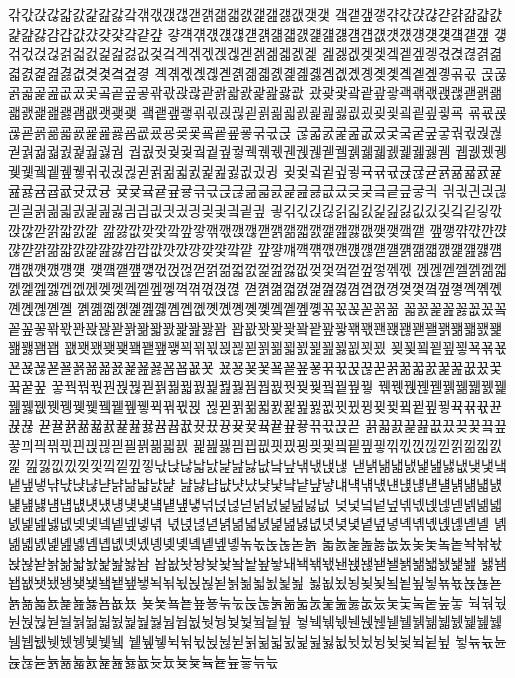 갂갃갅갆갋갌갍갎갏갘갞갟갡갢갣갥갦갧갨갩갪갫갮갲갳
갴갵갶갷갺갻갽갾갿걁걂걃걄걅걆걇걈걉걊걌걎걏걐걑걒
걓걕걖걗걙걚걛걝걞걟걠걡걢걣걤걥걦걧걨걩걪걫걬걭걮
걯걲걳걵걶걹걻걼걽걾걿겂겇겈겍겎겏겑겒겓겕겖겗겘겙
겚겛겞겢겣겤겥겦겧겫겭겮겱겲겳겴겵겶겷겺겾겿곀곂곃
곅곆곇곉곊곋곍곎곏곐곑곒곓곔곖곘곙곚곛곜곝곞곟곢곣
곥곦곩곫곭곮곲곴곷곸곹곺곻곾곿괁괂괃괅괇괈괉괊괋괎
괐괒괓괔괕괖괗괙괚괛괝괞괟괡괢괣괤괥괦괧괨괪괫괮괯
괰괱괲괳괶괷괹괺괻괽괾괿굀굁굂굃굆굈굊굋굌굍굎굏굑
굒굓굕굖굗굙굚굛굜굝굞굟굠굢굤굥굦굧굨굩굪굫굮굯굱
굲굷굸굹굺굾궀궃궄궅궆궇궊궋궍궎궏궑궒궓궔궕궖궗궘
궙궚궛궞궟궠궡궢궣궥궦궧궨궩궪궫궬궭궮궯궰궱궲궳궴
궵궶궸궹궺궻궼궽궾궿귂귃귅귆귇귉귊귋귌귍귎귏귒귔귕
귖귗귘귙귚귛귝귞귟귡귢귣귥귦귧귨귩귪귫귬귭귮귯귰귱
귲귳귴귵귶귷귺귻귽귾긂긃긄긅긆긇긊긌긎긏긐긑긒긓긕
긖긗긘긙긚긛긜긝긞긟긠긡긢긣긤긥긦긧긨긩긪긫긬긭긮
긯긲긳긵긶긹긻긼긽긾긿깂깄깇깈깉깋깏깑깒깓깕깗깘깙
깚깛깞깢깣깤깦깧깪깫깭깮깯깱깲깳깴깵깶깷깺깾깿꺀꺁
꺂꺃꺆꺇꺈꺉꺊꺋꺍꺎꺏꺐꺑꺒꺓꺔꺕꺖꺗꺘꺙꺚꺛꺜꺝
꺞꺟꺠꺡꺢꺣꺤꺥꺦꺧꺨꺩꺪꺫꺬꺭꺮꺯꺰꺱꺲꺳꺴꺵꺶
꺷꺸꺹꺺꺻꺿껁껂껃껅껆껇껈껉껊껋껎껒껓껔껕껖껗껚껛
껝껞껟껠껡껢껣껤껥껦껧껩껪껬껮껯껰껱껲껳껵껶껷껹껺
껻껽껾껿꼀꼁꼂꼃꼄꼅꼆꼉꼊꼋꼌꼎꼏꼑꼒꼓꼔꼕꼖꼗꼘
꼙꼚꼛꼜꼝꼞꼟꼠꼡꼢꼣꼤꼥꼦꼧꼨꼩꼪꼫꼮꼯꼱꼳꼵꼶
꼷꼸꼹꼺꼻꼾꽀꽄꽅꽆꽇꽊꽋꽌꽍꽎꽏꽑꽒꽓꽔꽕꽖꽗꽘
꽙꽚꽛꽞꽟꽠꽡꽢꽣꽦꽧꽨꽩꽪꽫꽬꽭꽮꽯꽰꽱꽲꽳꽴꽵
꽶꽷꽸꽺꽻꽼꽽꽾꽿꾁꾂꾃꾅꾆꾇꾉꾊꾋꾌꾍꾎꾏꾒꾓꾔
꾖꾗꾘꾙꾚꾛꾝꾞꾟꾠꾡꾢꾣꾤꾥꾦꾧꾨꾩꾪꾫꾬꾭꾮꾯
꾰꾱꾲꾳꾴꾵꾶꾷꾺꾻꾽꾾꾿꿁꿂꿃꿄꿅꿆꿊꿌꿏꿐꿑꿒
꿓꿕꿖꿗꿘꿙꿚꿛꿝꿞꿟꿠꿡꿢꿣꿤꿥꿦꿧꿪꿫꿬꿭꿮꿯
꿲꿳꿵꿶꿷꿹꿺꿻꿼꿽꿾꿿뀂뀃뀅뀆뀇뀈뀉뀊뀋뀍뀎뀏뀑
뀒뀓뀕뀖뀗뀘뀙뀚뀛뀞뀟뀠뀡뀢뀣뀤뀥뀦뀧뀩뀪뀫뀬뀭뀮
뀯뀰뀱뀲뀳뀴뀵뀶뀷뀸뀹뀺뀻뀼뀽뀾뀿끀끁끂끃끆끇끉끋
끍끏끐끑끒끖끘끚끛끜끞끟끠끡끢끣끤끥끦끧끨끩끪끫끬
끭끮끯끰끱끲끳끴끵끶끷끸끹끺끻끾끿낁낂낃낅낆낇낈낉
낊낋낎낐낒낓낔낕낖낗낛낝낞낣낤낥낦낧낪낰낲낶낷낹낺
낻낽낾낿냀냁냂냃냆냊냋냌냍냎냏냒냓냕냖냗냙냚냛냜냝
냞냟냡냢냣냤냦냧냨냩냪냫냬냭냮냯냰냱냲냳냴냵냶냷냸
냹냺냻냼냽냾냿넀넁넂넃넄넅넆넇넊넍넎넏넑넔넕넖넗넚
넞넟넠넡넢넦넧넩넪넫넭넮넯넰넱넲넳넶넺넻넼넽넾넿녂
녃녅녆녇녉녊녋녌녍녎녏녒녓녖녗녙녚녛녝녞녟녡녢녣녤
녥녦녧녨녩녪녫녬녭녮녯녰녱녲녳녴녵녶녷녺녻녽녾녿놁
놃놄놅놆놇놊놌놎놏놐놑놕놖놗놙놚놛놝놞놟놠놡놢놣놤
놥놦놧놩놪놫놬놭놮놯놰놱놲놳놴놵놶놷놸놹놺놻놼놽놾
놿뇀뇁뇂뇃뇄뇅뇆뇇뇈뇉뇊뇋뇍뇎뇏뇑뇒뇓뇕뇖뇗뇘뇙뇚
뇛뇞뇠뇡뇢뇣뇤뇥뇦뇧뇪뇫뇭뇮뇯뇱뇲뇳뇴뇵뇶뇷뇸뇺뇼
뇾뇿눀눁눂눃눆눇눉눊눍눎눏눐눑눒눓눖눘눚눛눜눝눞눟
눡눢눣눤눥눦눧눨눩눪눫눬눭눮눯눰눱눲눳눵눶눷눸눹눺
눻눽눾눿뉀뉁뉂뉃뉄뉅뉆뉇뉈뉉뉊뉋뉌뉍뉎뉏뉐뉑뉒뉓뉔
뉕뉖뉗뉙뉚뉛뉝뉞뉟뉡뉢뉣뉤뉥뉦뉧뉪뉫뉬뉭뉮뉯뉰뉱뉲
뉳뉶뉷뉸뉹뉺뉻뉽뉾뉿늀늁늂늃늆늇늈늊늋늌늍늎늏늒늓
